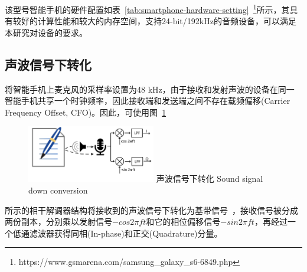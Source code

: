该型号智能手机的硬件配置如表~\ref{tab:smartphone-hardware-setting}~\footnote{https://www.gsmarena.com/samsung\_galaxy\_s6-6849.php}所示，其具有较好的计算性能和较大的内存空间，支持24-bit/192kHz的音频设备，可以满足本研究对设备的要求。

\subsection{声波信号下转化}
将智能手机上麦克风的采样率设置为48 kHz，由于接收和发射声波的设备在同一智能手机共享一个时钟频率，因此接收端和发送端之间不存在载频偏移(Carrier Frequency Offset, CFO)。因此，可使用图~\ref{fig:sound-signal-down-conversion}
\begin{figure}[!htp]
  \centering
  \includegraphics[width=0.5\textwidth]{figure/down-conversion.pdf}
  \bicaption
    {声波信号下转化}
    {Sound signal down conversion}
  \label{fig:sound-signal-down-conversion}
\end{figure}
所示的相干解调器结构将接收到的声波信号下转化为基带信号~\cite{tse2005fundamentals}，接收信号被分成两份副本，分别乘以发射信号$-cos2\pi ft$和它的相位偏移信号$-sin2\pi ft$，再经过一个低通滤波器获得同相(In-phase)和正交(Quadrature)分量。

